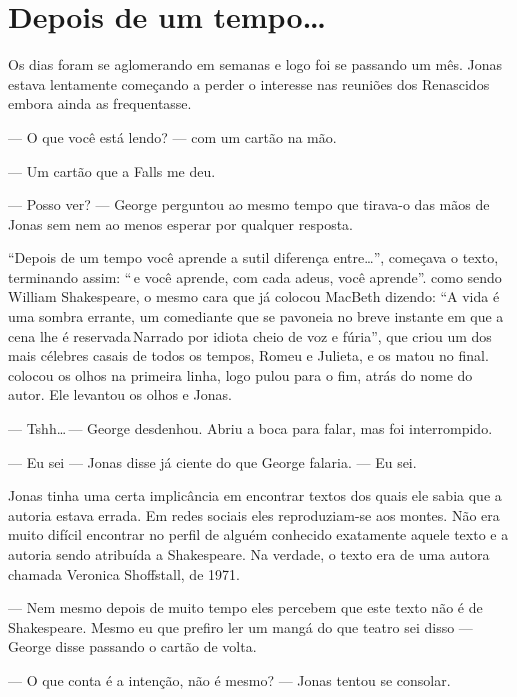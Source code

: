 \chapter{Depois de um tempo\ldots}

Os dias foram se aglomerando em semanas e logo foi se passando um mês. Jonas estava lentamente começando a perder o interesse nas reuniões dos Renascidos\mudanca{,} embora ainda as frequentasse.

--- O que você está lendo? ---  com um cartão na mão.

--- Um cartão que a Falls me deu.

--- Posso ver? --- George perguntou\mudanca{,} ao mesmo tempo que tirava-o das mãos de Jonas\mudanca{,} sem nem ao menos esperar por qualquer resposta.

``Depois de um tempo você aprende a sutil diferença entre\ldots'', começava o texto, terminando assim: ``\mudanca{\ldots}\,e você aprende, com cada adeus, você aprende''.  como sendo William Shakespeare, o mesmo cara que já colocou MacBeth dizendo: ``A vida é uma sombra errante, um comediante que se pavoneia no breve instante em que a cena lhe é reservada\mudanca{\ldots}\,Narrado por idiota cheio de voz e fúria'', que criou um dos mais célebres casais de todos os tempos, Romeu e Julieta, e os matou no final.  colocou os olhos na primeira linha, logo pulou para o fim, atrás do nome do autor. Ele levantou os olhos e  Jonas.

--- Tshh\ldots\,--- George desdenhou. Abriu a boca para falar, mas foi interrompido.

--- Eu sei --- Jonas disse\mudanca{,} já ciente do que George falaria. --- Eu sei.

Jonas tinha uma certa implicância em encontrar textos dos quais ele sabia que a autoria estava errada. Em redes sociais eles reproduziam-se aos montes. Não era muito difícil encontrar no perfil de alguém conhecido exatamente aquele texto e a autoria sendo atribuída a Shakespeare. Na verdade, o texto era de uma autora chamada Veronica Shoffstall, de 1971.

--- Nem mesmo depois de muito tempo eles percebem que este texto não é de Shakespeare. Mesmo eu que prefiro ler um mangá do que teatro sei disso --- George disse\mudanca{,} passando o cartão de volta.

--- O que conta é a intenção, não é mesmo? --- Jonas tentou se consolar.

